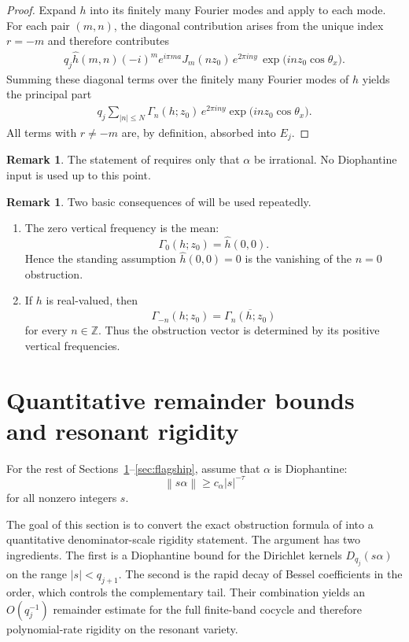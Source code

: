 \documentclass[11pt,reqno]{amsart}
\theoremstyle{definition}
\newtheorem{remark}[theorem]{Remark}
\newcommand{\Z}{\mathbb{Z}}
\newcommand{\e}[1]{e^{2\pi i #1}}
\newcommand{\norm}[1]{\left\lVert #1 \right\rVert}
\newcommand{\abs}[1]{\left\lvert #1 \right\rvert}
\newcommand{\qj}{q_j}
\newcommand{\qjp}{q_{j+1}}
\begin{document}
\begin{proof}
Expand $h$ into its finitely many Fourier modes and apply  to each mode.
For each pair $(m,n)$, the diagonal contribution arises from the unique index $r=-m$ and
therefore contributes
\[
\begin{aligned}
\qj \widehat h(m,n)(-i)^m e^{i\pi m a} J_m(nz_0)\,\e{ny}
\,\exp\!\bigl(i n z_0\cos\theta_x\bigr).
\end{aligned}
\]
Summing these diagonal terms over the finitely many Fourier modes of $h$ yields the
principal part
\[
\begin{aligned}
\qj \sum_{\abs{n}\le N}\Gamma_n(h;z_0)\,\e{ny}\exp\!\bigl(i n z_0\cos\theta_x\bigr).
\end{aligned}
\]
All terms with $r\ne -m$ are, by definition, absorbed into $E_j$.
\end{proof}

\begin{remark}\label{rem:obstruction-geometry}
The statement of  requires only that $\alpha$ be irrational. No
Diophantine input is used up to this point.
\end{remark}

\begin{remark}\label{rem:obstruction-geometry-2}
Two basic consequences of  will be used repeatedly.
\begin{enumerate}[label=\arabic*.]
\item The zero vertical frequency is the mean:
\[
\Gamma_0(h;z_0)=\widehat h(0,0).
\]
Hence the standing assumption $\widehat h(0,0)=0$ is the vanishing of the
$n=0$ obstruction.
\item If $h$ is real-valued, then
\[
\Gamma_{-n}(h;z_0)=\overline{\Gamma_n(h;z_0)}
\]
for every $n\in\Z$. Thus the obstruction vector is determined by its positive vertical
frequencies.
\end{enumerate}
\end{remark}

\section{Quantitative remainder bounds and resonant rigidity}\label{sec:quantitative}

For the rest of Sections~\ref{sec:quantitative}--\ref{sec:flagship}, assume that $\alpha$ is
Diophantine:
\[
\norm{s\alpha}\ge c_\alpha \abs{s}^{-\tau}
\]
for all nonzero integers $s$.

The goal of this section is to convert the exact obstruction formula of 
into a quantitative denominator-scale rigidity statement. The argument has two ingredients. The
first is a Diophantine bound for the Dirichlet kernels $D_{\qj}(s\alpha)$ on the range
$\abs{s}<\qjp$. The second is the rapid decay of Bessel coefficients in the order, which
controls the complementary tail. Their combination yields an $O(\qj^{-1})$ remainder estimate
for the full finite-band cocycle and therefore polynomial-rate rigidity on the resonant variety.
\end{document}
